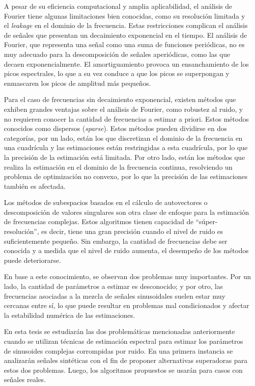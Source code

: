 A pesar de su eficiencia computacional y amplia aplicabilidad, el análisis de Fourier tiene algunas limitaciones bien conocidas, como su resolución limitada y el \emph{leakage} en el dominio de la frecuencia. Estas restricciones complican el análisis de señales que presentan un decaimiento exponencial en el tiempo. El análisis de Fourier, que representa una señal como una suma de funciones periódicas, no es muy adecuado para la descomposición de señales aperiódicas, como las que decaen exponencialmente. El amortiguamiento provoca un ensanchamiento de los picos espectrales, lo que a su vez conduce a que los picos se superpongan y enmascaren los picos de amplitud más pequeños. 

Para el caso de frecuencias sin decaimiento exponencial, existen métodos que exhiben grandes ventajas sobre el análisis de Fourier, como robustez al ruido, y no requieren conocer la cantidad de frecuencias a estimar a priori. Estos métodos conocidos como dispersos (\emph{sparse}). Estos métodos pueden dividirse en dos categorías, por un lado, están los que discretizan el dominio de la frecuencia en una cuadrícula y las estimaciones están restringidas a esta cuadrícula, por lo que la precisión de la estimación está limitada. Por otro lado, están los métodos que realiza la estimación en el dominio de la frecuencia continua, resolviendo un problema de optimización no convexo, por lo que la precisión de las estimaciones también es afectada. 

Los métodos de subespacios basados en el cálculo de autovectores o descomposición de valores singulares son otra clase de enfoque para la estimación de frecuencias complejas. Estos algoritmos tienen capacidad de ``súper-resolución'', es decir, tiene una gran precisión cuando el nivel de ruido es suficientemente pequeño. Sin embargo, la cantidad de frecuencias debe ser conocida y a medida que el nivel de ruido aumenta, el desempeño de los métodos puede deteriorarse.


En base a este conocimiento, se observan dos problemas muy importantes. Por un lado, la cantidad de parámetros a estimar es desconocido; y por otro, las frecuencias asociadas a la mezcla de señales sinusoidales suelen estar muy cercanas entre sí, lo que puede resultar en problemas mal condicionados y afectar la estabilidad numérica de las estimaciones.

En esta tesis se estudiarán las dos problemáticas mencionadas anteriormente cuando se utilizan técnicas de estimación espectral para estimar los parámetros de sinusoides complejas corrompidas por ruido. En una primera instancia se analizarán señales sintéticas con el fin de proponer alternativas superadoras para estos dos problemas. Luego, los algoritmos propuestos se usarán para casos con señales reales.

